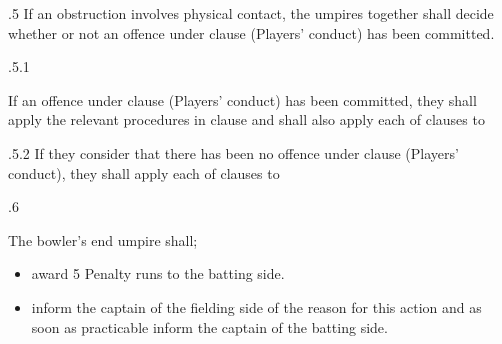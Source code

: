 \documentclass[12pt]{article}
\begin{document}
\vspace{\baselineskip}
\begin{adjustwidth}{0.5in}{0.33in}
{\fontsize{9pt}{10.8pt}.5 \tabto{0.49in} If an obstruction involves physical contact, the umpires together shall decide whether or not an offence under clause (Players’ conduct) has been committed.\par}\par

\end{adjustwidth}


\vspace{\baselineskip}
\begin{adjustwidth}{1.18in}{0.38in}
{\fontsize{9pt}{10.8pt}.5.1 \tabto{1.17in} {\fontsize{8pt}{9.6pt}\selectfont If an offence under clause (Players’ conduct) has been committed, they shall apply the relevant procedures in clause and shall also apply each of clauses to \par}\par}\par

\end{adjustwidth}


\vspace{\baselineskip}
\begin{adjustwidth}{1.18in}{0.18in}
{\fontsize{9pt}{10.8pt}.5.2 \tabto{1.17in} If they consider that there has been no offence under clause (Players’ conduct), they shall apply each of clauses to \par}\par

\end{adjustwidth}


\vspace{\baselineskip}
{\fontsize{9pt}{10.8pt}.6 \tabto{0.49in} {\fontsize{8pt}{9.6pt}\selectfont The bowler’s end umpire shall;\par}\par}\par


\vspace{\baselineskip}
\begin{itemize}
	\item {\fontsize{9pt}{10.8pt}\selectfont award 5 Penalty runs to the batting side.\par}\par


\vspace{\baselineskip}
	\item {\fontsize{9pt}{10.8pt}\selectfont inform the captain of the fielding side of the reason for this action and as soon as practicable inform the captain of the batting side.\par}
\end{itemize}\par
\end{document}
